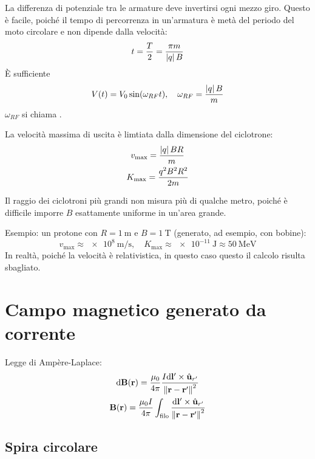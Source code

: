 La differenza di potenziale tra le armature deve invertirsi ogni mezzo giro.
Questo è facile, poiché il tempo di percorrenza in un'armatura è metà del periodo del moto circolare e non dipende dalla velocità:
\begin{equation}
    t = \frac{T}{2} = \frac{\pi m}{\left\lvert q \right\rvert B}
\end{equation}
È sufficiente
\begin{equation}
    V(t) = V_0 \sin(\omega_{RF} t), \quad \omega_{RF} = \frac{\left\lvert q \right\rvert B}{m}
\end{equation}
$\omega_{RF}$ si chiama .

La velocità massima di uscita è limtiata dalla dimensione del ciclotrone:
\begin{gather}
    v_\mathrm{max} = \frac{\left\lvert q \right\rvert B R}{m} \\
    K_\mathrm{max} = \frac{q^2 B^2 R^2}{2m}
\end{gather}

Il raggio dei ciclotroni più grandi non misura più di qualche metro, poiché è difficile imporre $B$ esattamente uniforme in un'area grande.

Esempio: un protone con $R = \qty{1}{\metre}$ e $B = \qty{1}{\tesla}$ (generato, ad esempio, con bobine):
\begin{equation}
    v_\mathrm{max} \approx \qty{e8}{\metre\per\second}, \quad K_\mathrm{max} \approx \qty{e-11}{\joule} \approx \qty{50}{\mega\electronvolt}
\end{equation}
In realtà, poiché la velocità è relativistica, in questo caso questo il calcolo risulta sbagliato.





\section{Campo magnetico generato da corrente}

Legge di Ampère-Laplace:
\begin{subequations}
\begin{gather}
    \mathrm{d} \mathbf{B}(\mathbf{r}) = \frac{\mu_0}{4\pi} \frac{I \mathrm{d} \mathbf{l}' \times \hat{\mathbf{u}}_{r'}}{\left\lVert \mathbf{r} - \mathbf{r}' \right\rVert^2} \\
    \mathbf{B}(\mathbf{r}) = \frac{\mu_0 I}{4\pi} \int_\mathrm{filo} \frac{\mathrm{d} \mathbf{l}' \times \hat{\mathbf{u}}_{r'}}{\left\lVert \mathbf{r} - \mathbf{r}' \right\rVert^2}
\end{gather}
\end{subequations}

\subsection{Spira circolare}

